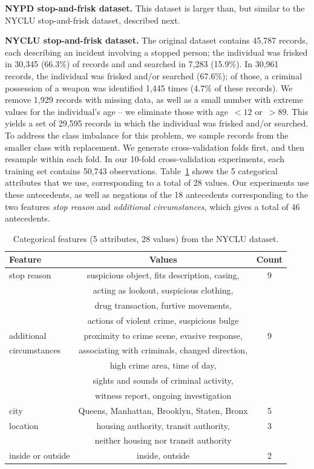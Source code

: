 \textbf{NYPD stop-and-frisk dataset.} This dataset is larger than, but similar to the
NYCLU stop-and-frisk dataset, described next.

\newpage
\textbf{NYCLU stop-and-frisk dataset.} The original dataset contains 45,787 records,
each describing an incident involving a stopped person; the individual
was frisked in 30,345 (66.3\%) of records and and searched in 7,283 (15.9\%).
%
In 30,961 records, the individual was frisked and/or searched (67.6\%); of those,
a criminal possession of a weapon was identified 1,445 times (4.7\% of these records).
%
We remove 1,929 records with missing data, as well as a small number with extreme values
for the individual's age -- we eliminate those with age~${< 12}$ or~${>89}$.
%
This yields a set of 29,595 records in which the individual was frisked and/or searched.
%
To address the class imbalance for this problem, we sample records from the
smaller class with replacement.
%
We generate cross-validation folds first, and then resample within each fold.
%
In our 10-fold cross-validation experiments, each training set contains 50,743 observations.
%
Table~\ref{tab:frisk-data} shows the 5 categorical attributes that we use,
corresponding to a total of 28 values.
%
Our experiments use these antecedents,
as well as negations of the 18 antecedents corresponding to the two features
\emph{stop reason} and \emph{additional circumstances},
which gives a total of 46 antecedents.

\begin{table}[h!]
\centering
\begin{tabular}{l | c  c}
Feature & Values & Count \\
\hline
stop reason & suspicious object, fits description, casing, & 9 \\
& acting as lookout, suspicious clothing, & \\
& drug transaction, furtive movements, & \\
& actions of violent crime, suspicious bulge \\
\hline
additional & proximity to crime scene, evasive response,  & 9 \\
circumstances & associating with criminals, changed direction, & \\
& high crime area, time of day,  & \\
& sights and sounds of criminal activity, & \\
& witness report, ongoing investigation & \\
\hline
city & Queens,  Manhattan, Brooklyn, Staten, Bronx & 5 \\
\hline
location & housing authority, transit authority, & 3 \\
& neither housing nor transit authority & \\
\hline
inside or outside & inside, outside & 2 \\
\end{tabular}
\caption{Categorical features (5 attributes, 28 values) from the NYCLU dataset.}
\vspace{4mm}
\label{tab:frisk-data}
\end{table}

